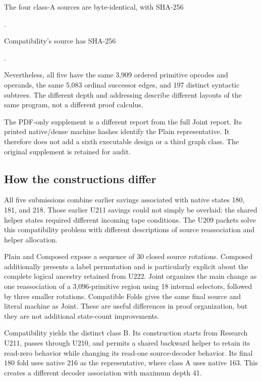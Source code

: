 \documentclass[11pt,letterpaper]{article}
\begin{document}
The four class-A sources are byte-identical, with SHA-256
\begin{center}\small
{}.
\end{center}
Compatibility's source has SHA-256
\begin{center}\small
{}.
\end{center}
Nevertheless, all five have the same 3,909 ordered primitive opcodes and
operands, the same 5,083 ordinal successor edges, and 197 distinct syntactic
subtrees. The different depth and addressing describe different layouts of
the same program, not a different proof calculus.

The PDF-only supplement is a different report from the full Joint report.
Its printed native/dense machine hashes identify the Plain representative.
It therefore does not add a sixth executable design or a third graph class.
The original supplement is retained for audit.

\subsection{How the constructions differ}
All five submissions combine earlier savings associated with native states
180, 181, and 218. Those earlier U211 savings could not simply be overlaid:
the shared helper states required different incoming tape conditions.
The U209 packets solve this compatibility problem with different
descriptions of source reassociation and helper allocation.

Plain and Composed expose a sequence of 30 closed source rotations.
Composed additionally presents a label permutation and is particularly
explicit about the complete logical ancestry retained from U222.
Joint organizes the main change as one reassociation of a 3,096-primitive
region using 18 internal selectors, followed by three smaller rotations.
Compatible Folds gives the same final source and literal machine as Joint.
These are useful differences in proof organization, but they are not
additional state-count improvements.

Compatibility yields the distinct class B. Its construction starts from
Research U211, passes through U210, and permits a shared backward helper
to retain its read-zero behavior while changing its read-one source-decoder
behavior. Its final $180$ fold uses native 216 as the representative,
where class A uses native 163. This creates a different decoder association
with maximum depth 41.
\end{document}
